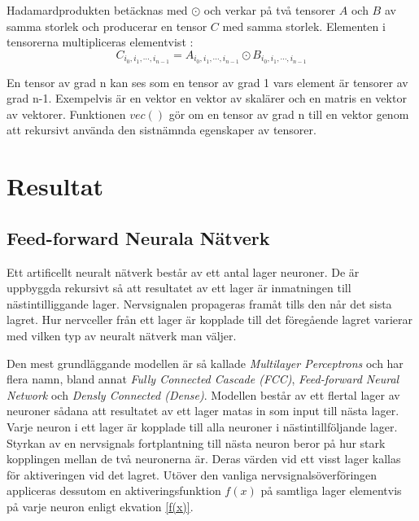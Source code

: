 \documentclass[a4paper,11pt,twoside]{article}
\begin{document}
Hadamardprodukten betäcknas med $\odot$ och verkar på två tensorer $A$ och $B$ av samma storlek och producerar en tensor $C$ med samma storlek.\cite{cs231n} Elementen i tensorerna multipliceras elementvist : 
\begin{equation}
	C_{i_0, i_1, \cdots, i_{n-1}} = A_{i_0, i_1, \cdots, i_{n-1}} \odot B_{i_0, i_1, \cdots, i_{n-1}}
\end{equation}

En tensor av grad n kan ses som en tensor av grad 1 vars element är tensorer av grad n-1. Exempelvis är en vektor en vektor av skalärer och en matris en vektor av vektorer. Funktionen $vec()$ gör om en tensor av grad n till en vektor genom att rekursivt använda den sistnämnda egenskaper av tensorer. \cite{convmath}

\section{Resultat}
\subsection{Feed-forward Neurala Nätverk}
Ett artificellt neuralt nätverk består av ett antal lager neuroner. De är uppbyggda rekursivt så att resultatet av ett lager är inmatningen till nästintilliggande lager. Nervsignalen propageras framåt tills den når det sista lagret. Hur nervceller från ett lager är kopplade till det föregående lagret varierar med vilken typ av neuralt nätverk man väljer. \cite{cs231n}

Den mest grundläggande modellen är så kallade \textit{Multilayer Perceptrons} och har flera namn, bland annat \textit{Fully Connected Cascade (FCC)}, \textit{Feed-forward Neural Network} och \textit{Densly Connected (Dense)}. Modellen består av ett flertal lager av neuroner sådana att resultatet av ett lager matas in som input till nästa lager. Varje neuron i ett lager är kopplade till alla neuroner i nästintillföljande lager. Styrkan av en nervsignals fortplantning till nästa neuron beror på hur stark kopplingen mellan de två neuronerna är. Deras värden vid ett visst lager kallas för aktiveringen vid det lagret. Utöver den vanliga nervsignalsöverföringen appliceras dessutom en aktiveringsfunktion $f(x)$ på samtliga lager elementvis på varje neuron enligt ekvation \eqref{f(x)}. \cite{cs231n}
\end{document}
